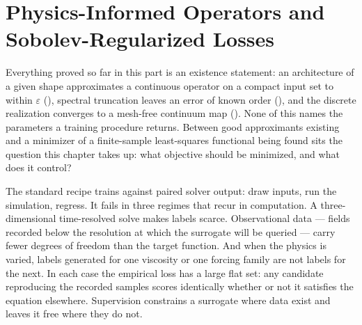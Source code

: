 
\chapter{Physics-Informed Operators and Sobolev-Regularized Losses}
\label{ch:part1-physics-informed-operators-and-sobolev-reg}
\label{sec:pino}

Everything proved so far in this part is an existence statement: an architecture of a given
shape approximates a continuous operator on a compact input set to within $\varepsilon$
(), spectral truncation leaves
an error of known order (), and
the discrete realization converges to a mesh-free continuum map
(). None of this names the
parameters a training procedure returns. Between good approximants existing and a minimizer
of a finite-sample least-squares functional being found sits the question this chapter takes
up: what objective should be minimized, and what does it control?

The standard recipe trains against paired solver output: draw inputs, run the simulation,
regress. It fails in three regimes that recur in computation. A three-dimensional
time-resolved solve makes labels scarce. Observational data --- fields recorded below the
resolution at which the surrogate will be queried --- carry fewer degrees of freedom than the
target function. And when the physics is varied, labels generated for one viscosity or one
forcing family are not labels for the next. In each case the empirical loss has a large flat
set: any candidate reproducing the recorded samples scores identically whether or not it
satisfies the equation elsewhere. Supervision constrains a surrogate where data
exist and leaves it free where they do not.

